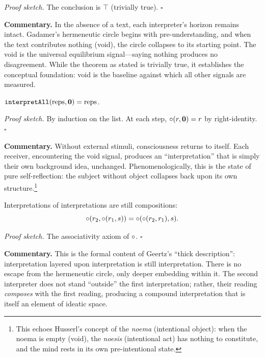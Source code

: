 \noindent\textit{Proof sketch.}\quad
The conclusion is $\top$ (trivially true).
\hfill$\square$

\medskip

\noindent\textbf{Commentary.}
In the absence of a text, each interpreter's horizon remains intact.
Gadamer's hermeneutic circle begins with pre-understanding, and when the
text contributes nothing (void), the circle collapses to its starting
point.  The void is the universal equilibrium signal---saying nothing
produces no disagreement.  While the theorem as stated is trivially true,
it establishes the conceptual foundation: void is the baseline against
which all other signals are measured.

\begin{theorem}
\label{thm:void_preserves_backgrounds}
$\texttt{interpretAll}(\text{reps}, \mathbf{0}) = \text{reps}$.
\end{theorem}

\noindent\textit{Proof sketch.}\quad
By induction on the list.  At each step, $\circ(r, \mathbf{0}) = r$ by
right-identity.
\hfill$\square$

\medskip

\noindent\textbf{Commentary.}
Without external stimuli, consciousness returns to itself.  Each receiver,
encountering the void signal, produces an ``interpretation'' that is simply
their own background idea, unchanged.  Phenomenologically, this is the
state of pure self-reflection: the subject without object collapses back
upon its own structure.\footnote{This echoes Husserl's concept of the
\textit{noema} (intentional object): when the noema is empty (void), the
\textit{noesis} (intentional act) has nothing to constitute, and the mind
rests in its own pre-intentional state.}

\begin{theorem}
\label{thm:composition_closure}
Interpretations of interpretations are still compositions:
\[
  \circ(r_2, \circ(r_1, s)) = \circ(\circ(r_2, r_1), s).
\]
\end{theorem}

\noindent\textit{Proof sketch.}\quad
The associativity axiom of $\circ$.
\hfill$\square$

\medskip

\noindent\textbf{Commentary.}
This is the formal content of Geertz's ``thick description'':
interpretation layered upon interpretation is still interpretation.
There is no escape from the hermeneutic circle, only deeper embedding
within it.  The second interpreter does not stand ``outside'' the first
interpretation; rather, their reading \emph{composes} with the first
reading, producing a compound interpretation that is itself an element of
ideatic space.

